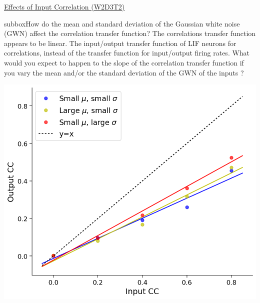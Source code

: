 \begin{textbox}{\href{https://compneuro.neuromatch.io/tutorials/W1D4_GeneralizedLinearModels/student/W1D4_Tutorial1.html}{Effects of Input Correlation (W2D3T2)} }


\begin{subbox}{subbox}{How do the mean and standard deviation of the Gaussian white noise (GWN) affect the correlation transfer function?}
\scriptsize
The correlations transfer function appears to be linear. The input/output transfer function of LIF neurons for correlations, instead of the transfer function for input/output firing rates.
What would you expect to happen to the slope of the correlation transfer function if you vary the mean and/or the standard deviation of the GWN of the inputs ?
\begin{center}
    
\includegraphics[scale=0.14]{Figures/BNM/LIF_Figure8.png}
\end{center}


\end{subbox}
\end{textbox}
